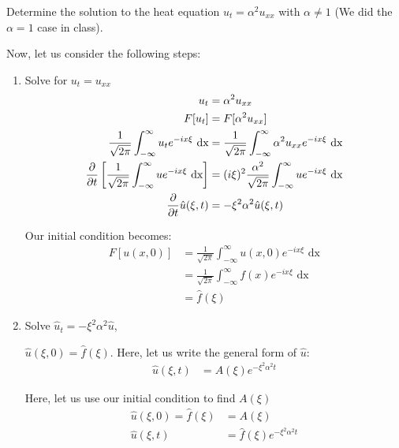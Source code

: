 \item Determine the solution to the heat equation $u_t = \alpha^2 u_{xx}$ with $\alpha \neq 1$ (We did the $\alpha = 1$ case in class).
\bigbreak

Now, let us consider the following steps:
%
\begin{enumerate}
  \item Solve for $u_t = u_{xx}$
  \begin{align}
    u_t & = \alpha^2 u_{xx}\\
    F[u_t] & = F[\alpha^2 u_{xx}]\\
    \frac{1}{\sqrt{2 \pi}} \int^\infty_{-\infty} u_t e^{-i x \xi} \text{ dx} & = \frac{1}{\sqrt{2 \pi}} \int^\infty_{-\infty} \alpha^2 u_{xx} e^{-i x \xi} \text{ dx}\\
    \frac{\partial}{\partial t} \left[ \frac{1}{\sqrt{2 \pi}} \int^\infty_{-\infty} u e^{-i x \xi} \text{ dx} \right]
    & = (i \xi)^2 \frac{\alpha^2}{\sqrt{2 \pi}} \int^\infty_{-\infty} u e^{-i x \xi} \text{ dx}\\
    \frac{\partial}{\partial t} \hat u(\xi, t) & = - \xi^2 \alpha^2 \hat u(\xi, t)
  \end{align}

  Our initial condition becomes:
  \begin{align}
    F[u(x, 0)] & = \frac{1}{\sqrt{2 \pi}} \int^\infty_{-\infty} u(x, 0) e^{-i x \xi} \text{ dx}\\
    & = \frac{1}{\sqrt{2 \pi}} \int^\infty_{-\infty} f(x) e^{-i x \xi} \text{ dx}\\
    & = \hat f(\xi)
  \end{align}
  \item Solve $\hat u_t = -\xi^2 \alpha^2 \hat u$,

  $\hat u(\xi, 0) = \hat f(\xi)$. Here, let us write the general form of $\hat u$:
  \begin{align}
    \hat u(\xi, t) & = A(\xi) e^{-\xi^2 \alpha^2 t}
  \end{align}

  Here, let us use our initial condition to find $A(\xi)$
  \begin{align}
    \hat u (\xi, 0) = \hat f(\xi) & = A(\xi)\\
    \hat u(\xi, t) & = \hat f(\xi) e^{-\xi^2 \alpha^2 t}
  \end{align}


\end{enumerate}
